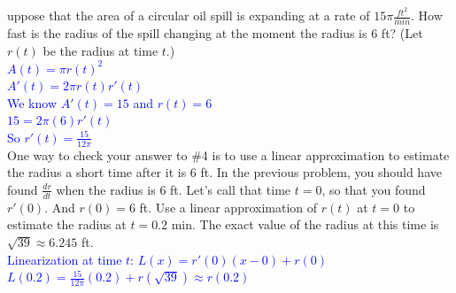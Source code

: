 \documentclass{ximera}
\begin{document}
\begin{exercise}
   uppose that the area of a circular oil spill is expanding at a rate of $15\pi \frac{ft^2}{min}$.  How fast is the radius of the spill changing at the moment the radius is 6 ft? (Let $r(t)$ be the radius at time $t$.) \\
     \textcolor{blue} {$A(t)=\pi r(t)^2$ \\
   $A'(t)=2\pi r(t)r'(t)$\\
   We know $A'(t)=15$ and $r(t)=6$\\
   $15=2\pi (6)r'(t)$\\
   So $r'(t)=\frac{15}{12\pi}$ }
\\
One way to check your answer  to \#4 is to use a linear approximation to estimate the radius a short time after it is 6 ft. In the previous problem, you should have found $\frac{dr}{dt}$ when the radius is $6$ ft. Let's call that time $t=0$, so that you found $r'(0).$ And $r(0)=6$ ft. Use a linear approximation of $r(t)$ at $t=0$ to estimate the radius at $t=0.2$ min. The exact value of the radius at this time is $\sqrt{39}\approx 6.245$ ft.\\
\textcolor{blue}{Linearization at time $t$: $L(x)=r'(0)(x-0)+r(0)$\\
$L(0.2)=\frac{15}{12\pi}(0.2)+r(\sqrt{39})\approx r(0.2)$}
\end{exercise}
\end{document}

